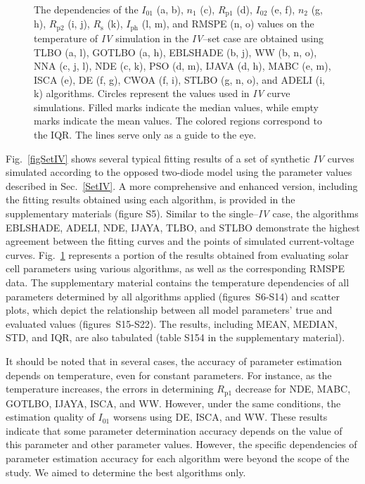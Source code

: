 \documentclass[a4paper,fleqn]{cas-sc}
\begin{document}
\begin{figure}[]
	  \caption{
The dependencies of the $I_{01}$ (a, b), $n_1$ (c), $R_\mathrm{p1}$ (d), $I_{02}$ (e, f),
$n_2$ (g, h), $R_\mathrm{p2}$ (i, j), $R_\mathrm{s}$ (k), $I_\mathrm{ph}$ (l, m), and RMSPE (n, o)
values on the temperature of \emph{IV} simulation in the \emph{IV}--set case are obtained using 
TLBO (a, l), GOTLBO (a, h), EBLSHADE (b, j), WW (b, n, o), NNA (c, j, l), NDE (c, k), PSO (d, m), IJAVA (d, h),
MABC (e, m), ISCA (e), DE (f, g), CWOA (f, i), STLBO (g, n, o), and ADELI (i, k) algorithms.
Circles represent the values used in \emph{IV} curve simulations. 
Filled marks indicate the median values, while empty marks indicate the mean values.
The colored regions correspond to the IQR. 
The lines serve only as a guide to the eye.
               }\label{figTDepIVset}
\end{figure}

Fig.~\ref{figSetIV} shows several typical fitting results of a set of synthetic \emph{IV} curves
simulated according to the opposed two-diode model using the parameter values described in Sec.~\ref{SetIV}.
A more comprehensive and enhanced version, including the fitting results obtained using each algorithm,
is provided in the supplementary materials (figure S5).
Similar to the single--\emph{IV} case, the algorithms EBLSHADE, ADELI, NDE, IJAYA, TLBO, and STLBO
demonstrate the highest agreement between the fitting curves and the points of simulated current-voltage curves.
Fig.~\ref{figTDepIVset} represents a portion of the results obtained from evaluating solar cell parameters using various algorithms,
as well as the corresponding RMSPE data.
The supplementary material contains the temperature dependencies of all
parameters determined by all algorithms applied (figures~S6-S14) and scatter plots,
which depict the relationship between all model parameters' true and evaluated values (figures~S15-S22).
The results, including MEAN, MEDIAN, STD, and IQR, are also tabulated (table S154 in the supplementary material).


It should be noted that in several cases, the accuracy of parameter estimation depends on temperature, even for constant parameters.
For instance, as the temperature increases,
the errors in determining $R_\mathrm{p1}$ decrease for NDE, MABC, GOTLBO, IJAYA, ISCA, and WW.
However, under the same conditions, the estimation quality of $I_{01}$ worsens using DE, ISCA, and WW.
These results indicate that some parameter determination accuracy
depends on the value of this parameter and other parameter values.
However, the specific dependencies of parameter estimation accuracy
for each algorithm were beyond the scope of the study.
We aimed to determine the best algorithms only.
\end{document}
